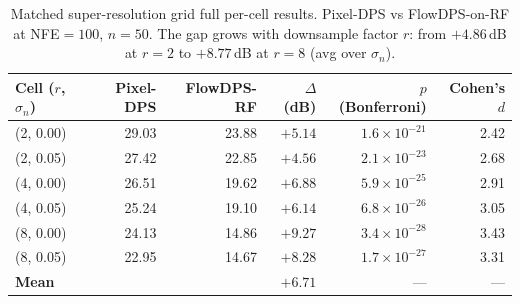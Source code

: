 \documentclass{article}
\begin{document}
\begin{table}[h]
  \centering
  \caption{Matched super-resolution grid full per-cell results.
    Pixel-DPS vs FlowDPS-on-RF at NFE${=}100$, $n{=}50$. The
    gap grows with downsample factor $r$: from ${+}4.86$\,dB at
    $r{=}2$ to ${+}8.77$\,dB at $r{=}8$ (avg over $\sigma_n$).}
  \label{tab:matched_sr_full}
  \begin{tabular}{lrrrrr}
    \toprule
    Cell ($r$, $\sigma_n$) & Pixel-DPS & FlowDPS-RF & $\Delta$ (dB) & $p$ (Bonferroni) & Cohen's $d$ \\
    \midrule
    (2, 0.00) & 29.03 & 23.88 & $+5.14$ & $1.6\times10^{-21}$ & 2.42 \\
    (2, 0.05) & 27.42 & 22.85 & $+4.56$ & $2.1\times10^{-23}$ & 2.68 \\
    (4, 0.00) & 26.51 & 19.62 & $+6.88$ & $5.9\times10^{-25}$ & 2.91 \\
    (4, 0.05) & 25.24 & 19.10 & $+6.14$ & $6.8\times10^{-26}$ & 3.05 \\
    (8, 0.00) & 24.13 & 14.86 & $+9.27$ & $3.4\times10^{-28}$ & 3.43 \\
    (8, 0.05) & 22.95 & 14.67 & $+8.28$ & $1.7\times10^{-27}$ & 3.31 \\
    \midrule
    \textbf{Mean}  &       &       & $\boldsymbol{+6.71}$ & --- & --- \\
    \bottomrule
  \end{tabular}
\end{table}
\end{document}
